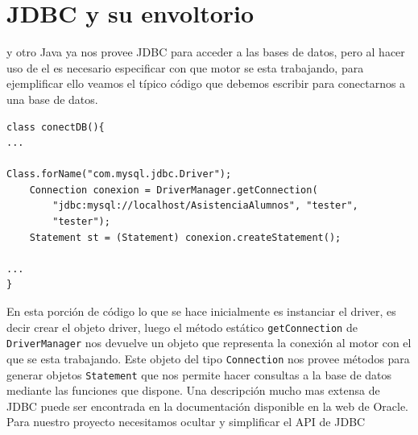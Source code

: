 \section{JDBC y su envoltorio}
y otro
Java ya nos provee JDBC para acceder a las bases de datos, pero al hacer uso de el es necesario especificar con que motor se esta trabajando, para ejemplificar ello veamos el típico código que debemos escribir para conectarnos a una base de datos.

\begin{lstlisting}[title=Porción de codigo java para la conexión a una base de datos]
class conectDB(){
...

Class.forName("com.mysql.jdbc.Driver");
	Connection conexion = DriverManager.getConnection(
		"jdbc:mysql://localhost/AsistenciaAlumnos", "tester",
		"tester");
	Statement st = (Statement) conexion.createStatement();

...
}
\end{lstlisting}

En esta porción de código lo que se hace inicialmente es instanciar el driver, es decir crear el objeto driver, luego el método estático \verb=getConnection= de 	\verb=DriverManager= nos devuelve un objeto que representa la conexión al motor con el que se esta trabajando. Este objeto del tipo \verb=Connection= nos provee métodos para generar objetos \verb=Statement= que nos permite hacer consultas a la base de datos mediante las funciones que dispone. Una descripción mucho mas extensa de JDBC puede ser encontrada en la documentación disponible en la web de Oracle\citep{java:jdbc}.
Para nuestro proyecto necesitamos ocultar y simplificar el API de JDBC

